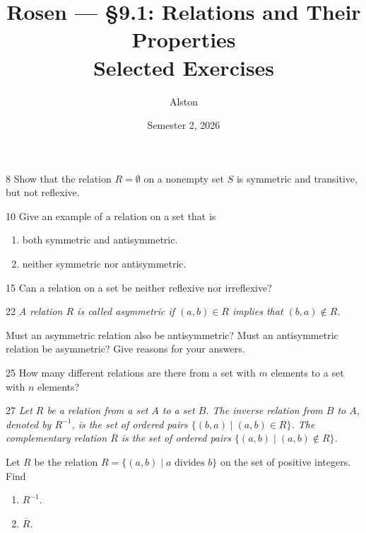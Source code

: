\documentclass[11pt]{article}
\title{Rosen --- \S 9.1: Relations and Their Properties\\ \large Selected Exercises}
\author{Alston}
\date{Semester 2, 2026}
\begin{document}
\maketitle

\begin{exercise}{8}
    Show that the relation $R = \emptyset$ on a nonempty set $S$ is
    symmetric and transitive, but not reflexive.
\end{exercise}

\begin{exercise}{10}
    Give an example of a relation on a set that is
    \begin{enumerate}[label=(\alph*)]
        \item both symmetric and antisymmetric.
        \item neither symmetric nor antisymmetric.
    \end{enumerate}
\end{exercise}

\begin{exercise}{15}
    Can a relation on a set be neither reflexive nor irreflexive?
\end{exercise}

\begin{exercise}{22}
    \textit{A relation $R$ is called \emph{asymmetric} if
    $(a,b) \in R$ implies that $(b,a) \notin R$.}

    Must an asymmetric relation also be antisymmetric? Must an
    antisymmetric relation be asymmetric? Give reasons for your
    answers.
\end{exercise}

\begin{exercise}{25}
    How many different relations are there from a set with $m$
    elements to a set with $n$ elements?
\end{exercise}

\begin{exercise}{27}
    \textit{Let $R$ be a relation from a set $A$ to a set $B$. The
    inverse relation from $B$ to $A$, denoted by $R^{-1}$, is the set
    of ordered pairs $\{(b,a) \mid (a,b) \in R\}$. The complementary
    relation $\overline{R}$ is the set of ordered pairs
    $\{(a,b) \mid (a,b) \notin R\}$.}

    Let $R$ be the relation $R = \{(a,b) \mid a \text{ divides } b\}$
    on the set of positive integers. Find
    \begin{enumerate}[label=(\alph*)]
        \item $R^{-1}$.
        \item $\overline{R}$.
    \end{enumerate}
\end{exercise}
\end{document}
